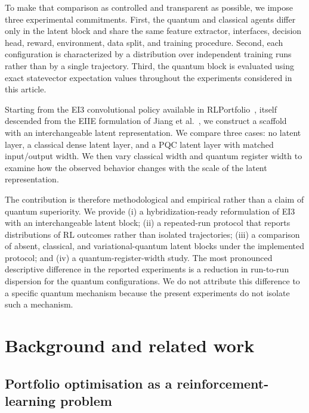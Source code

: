 \documentclass[aps,floatfix,superscriptaddress,twocolumn,tightenlines,amsmath,amssymb,nofootinbib,10pt,longbibliography,prl]{revtex4-2}
\begin{document}
To make that comparison as controlled and transparent as possible, we impose three experimental commitments. First, the quantum and classical agents differ only in the latent block and share the same feature extractor, interfaces, decision head, reward, environment, data split, and training procedure. Second, each configuration is characterized by a distribution over independent training runs rather than by a single trajectory. Third, the quantum block is evaluated using exact statevector expectation values throughout the experiments considered in this article.

Starting from the EI3 convolutional policy available in RLPortfolio~\cite{RLportfolio}, itself descended from the EIIE formulation of Jiang et al.~\cite{jiang2017deepreinforcementlearningframework}, we construct a scaffold with an interchangeable latent representation. We compare three cases: no latent layer, a classical dense latent layer, and a PQC latent layer with matched input/output width. We then vary classical width and quantum register width to examine how the observed behavior changes with the scale of the latent representation.

The contribution is therefore methodological and empirical rather than a claim of quantum superiority. We provide (i) a hybridization-ready reformulation of EI3 with an interchangeable latent block; (ii) a repeated-run protocol that reports distributions of RL outcomes rather than isolated trajectories; (iii) a comparison of absent, classical, and variational-quantum latent blocks under the implemented protocol; and (iv) a quantum-register-width study. The most pronounced descriptive difference in the reported experiments is a reduction in run-to-run dispersion for the quantum configurations. We do not attribute this difference to a specific quantum mechanism because the present experiments do not isolate such a mechanism.
\section{Background and related work}
\label{sec:background}

\subsection{Portfolio optimisation as a reinforcement-learning problem}
\label{subsec:bg-portfolio}
\end{document}
